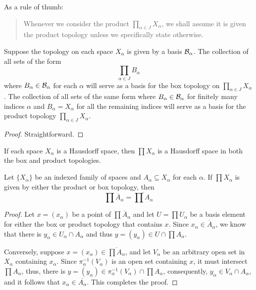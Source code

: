 As a rule of thumb:
\begin{quotation}
    Whenever we consider the product $\prod_{\alpha\in J}X_\alpha$, we shall assume it is given the product topology unless we specifically state otherwise.
\end{quotation}

\begin{theorem}
    Suppose the topology on each space $X_\alpha$ is given by a basis $\mathcal{B}_\alpha$. The collection of all sets of the form 
    \begin{equation*}
        \prod_{\alpha\in J}B_\alpha
    \end{equation*}
    where $B_\alpha\in\mathcal{B}_\alpha$ for each $\alpha$ will serve as a basis for the box topology on $\prod_{\alpha\in J}X_\alpha$. The collection of all sets of the same form where $B_\alpha\in\mathcal{B}_\alpha$ for finitely many indices $\alpha$ and $B_\alpha = X_\alpha$ for all the remaining indices will serve as a basis for the product topology $\prod_{\alpha\in J}X_\alpha$.
\end{theorem}
\begin{proof}
    Straightforward.
\end{proof}

\begin{theorem}
    If each space $X_\alpha$ is a Hausdorff space, then $\prod X_\alpha$ is a Hausdorff space in both the box and product topologies.
\end{theorem}

\begin{theorem}
    Let $\{X_\alpha\}$ be an indexed family of spaces and $A_\alpha\subseteq X_\alpha$ for each $\alpha$. If $\prod X_\alpha$ is given by either the product or box topology, then 
    \begin{equation*}
        \prod\overline{A}_\alpha = \overline{\prod A_\alpha}
    \end{equation*}
\end{theorem}
\begin{proof}
    Let $x = (x_\alpha)$ be a point of $\prod\overline{A}_\alpha$ and let $U = \prod U_\alpha$ be a basis element for either the box or product topology that contains $x$. Since $x_\alpha\in\overline{A}_\alpha$, we know that there is $y_\alpha\in U_\alpha\cap A_\alpha$ and thus $y = (y_\alpha)\in U\cap\prod A_\alpha$.

    Conversely, suppose $x = (x_\alpha)\in\overline{\prod A_\alpha}$, and let $V_\alpha$ be an arbitrary open set in $X_\alpha$ containing $x_\alpha$. Since $\pi_\alpha^{-1}(V_\alpha)$ is an open set containing $x$, it must intersect $\prod A_\alpha$, thus, there is $y = (y_\alpha)\in\pi_\alpha^{-1}(V_\alpha)\cap\prod A_\alpha$, consequently, $y_\alpha\in V_\alpha\cap A_\alpha$, and it follows that $x_\alpha\in\overline{A_\alpha}$. This completes the proof.
\end{proof}


